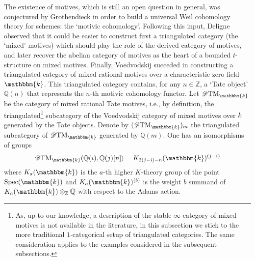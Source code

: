 \documentclass{article}
\theoremstyle{definition}
\newcommand{\Z}{\mathbb{Z}}
\begin{document}
The existence of motives, which is still an open question in general, was conjectured by Grothendieck in order to build a universal Weil cohomology theory for schemes: the `motivic cohomology'. Following this input, Deligne observed that it could be easier to construct first a triangulated category (the `mixed' motives) which should play the role of the derived category of motives, and later recover the abelian category of motives as the heart of a bounded $t$-structure on mixed motives. Finally, Voedvodskij succeded in constructing a triangulated category of mixed rational motives over a characteristic zero field $\mathbbm{k}$.
This triangulated category contains, for any $n \in \Z$, a `Tate object' $\mathbb{Q}(n)$ that represents the $n$-th motivic cohomology functor. Let $\mathscr{D}\textnormal{TM}_\mathbbm{k}$ be the category of mixed rational Tate motives, i.e., by definition, the triangulated\footnote{As, up to our knowledge, a description of the stable $\infty$-category of mixed motives is not available in the literature, in this subsection we stick to the more traditional $1$-categorical setup of triangulated categories. The same consideration applies to the examples considered in the subsequent subsections.} subcategory of the Voedvodskij category of mixed motives over $k$ generated by the Tate objects.  Denote by $(\mathscr{D}\textnormal{TM}_\mathbbm{k})_{m}$ the triangulated subcategory of $\mathscr{D}\textnormal{TM}_\mathbbm{k}$ generated by $\mathbb{Q}(m)$. One has an isomorphisms of groups
  \[
   \mathscr{D}\textnormal{TM}_\mathbbm{k}(\mathbb{Q}(i),\mathbb{Q}(j)[n])=K_{2(j-i)-n}(\mathbbm{k})^{(j-i)}
   \]
   where $K_a(\mathbbm{k})$ is the $a$-th higher $K$-theory group of the point $\textnormal{Spec}(\mathbbm{k})$ and $K_a(\mathbbm{k})^{(b)}$ is the weight $b$ summand of $K_a(\mathbbm{k}) \otimes_{\mathbb{Z}} \mathbb{Q}$ with respect to the Adams action. %
\end{document}
